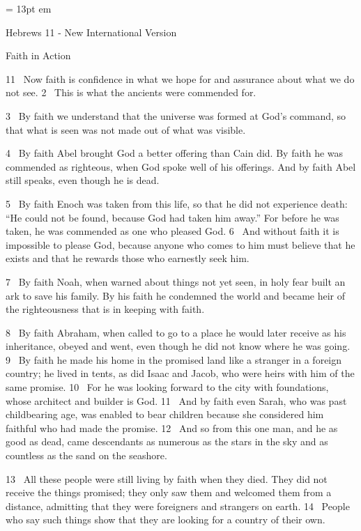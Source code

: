 

\FFrh \baselineskip = 13pt
 em


\centerline{  \FFbg
Hebrews 11 - New International Version }

\par
Faith in Action
\par
11 
Now faith is confidence in what we hope for
and assurance about what we do not see.
2 
This is what the ancients were commended for.
\par
3 
By faith we understand that the universe was formed at God’s command,
so that what is seen was not made out of what was visible.
\par
4 
By faith Abel brought God a better offering than Cain did. By faith he was commended
as righteous, when God spoke well of his offerings.
And by faith Abel still speaks, even though he is dead.
\par
5 
By faith Enoch was taken from this life, so that he did not experience death: “He could not be found, because God had taken him away.”
For before he was taken, he was commended as one who pleased God.
6 
And without faith it is impossible to please God, because anyone who comes to him
must believe that he exists and that he rewards those who earnestly seek him.
\par
7 
By faith Noah, when warned about things not yet seen,
in holy fear built an ark
to save his family.
By his faith he condemned the world and became heir of the righteousness that is in keeping with faith.
\par
8 
By faith Abraham, when called to go to a place he would later receive as his inheritance,
obeyed and went,
even though he did not know where he was going.
9 
By faith he made his home in the promised land
like a stranger in a foreign country; he lived in tents,
as did Isaac and Jacob, who were heirs with him of the same promise.
10 
For he was looking forward to the city
with foundations,
whose architect and builder is God.
11 
And by faith even Sarah, who was past childbearing age,
was enabled to bear children
because she
considered him faithful
who had made the promise.
12 
And so from this one man, and he as good as dead,
came descendants as numerous as the stars in the sky and as countless as the sand on the seashore.
\par
13 
All these people were still living by faith when they died. They did not receive the things promised;
they only saw them and welcomed them from a distance,
admitting that they were foreigners and strangers on earth.
14 
People who say such things show that they are looking for a country of their own.
